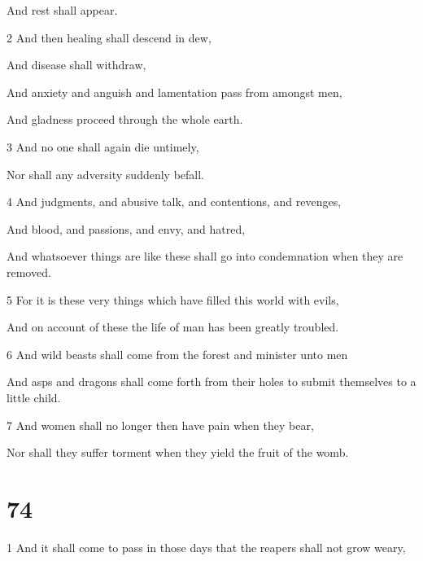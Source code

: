 \par And rest shall appear.

\par 2 And then healing shall descend in dew,

\par And disease shall withdraw,

\par And anxiety and anguish and lamentation pass from amongst men,

\par And gladness proceed through the whole earth.

\par 3 And no one shall again die untimely,

\par Nor shall any adversity suddenly befall.

\par 4 And judgments, and abusive talk, and contentions, and revenges,

\par And blood, and passions, and envy, and hatred,

\par And whatsoever things are like these shall go into condemnation when they are removed.

\par 5 For it is these very things which have filled this world with evils,

\par And on account of these the life of man has been greatly troubled.

\par 6 And wild beasts shall come from the forest and minister unto men

\par And asps and dragons shall come forth from their holes to submit themselves to a little child.

\par 7 And women shall no longer then have pain when they bear,

\par Nor shall they suffer torment when they yield the fruit of the womb.

\chapter{74}

\par 1 And it shall come to pass in those days that the reapers shall not grow weary,

